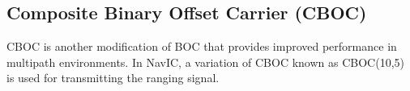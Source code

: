 \documentclass[10pt, onecolumn]{article}
\begin{document}
\begin{enumerate}
\subsection{Composite Binary Offset Carrier (CBOC)}
CBOC is another modification of BOC that provides improved performance in multipath environments. In NavIC, a variation of CBOC known as CBOC(10,5) is used for transmitting the ranging signal.






\end{enumerate}
\end{document}
